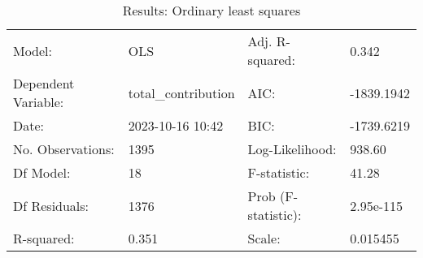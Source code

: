 \begin{table}
\caption{Results: Ordinary least squares}
\label{}
\begin{center}
\begin{tabular}{llll}
\hline
Model:              & OLS                 & Adj. R-squared:     & 0.342       \\
Dependent Variable: & total\_contribution & AIC:                & -1839.1942  \\
Date:               & 2023-10-16 10:42    & BIC:                & -1739.6219  \\
No. Observations:   & 1395                & Log-Likelihood:     & 938.60      \\
Df Model:           & 18                  & F-statistic:        & 41.28       \\
Df Residuals:       & 1376                & Prob (F-statistic): & 2.95e-115   \\
R-squared:          & 0.351               & Scale:              & 0.015455    \\
\hline
\end{tabular}
\end{center}


\end{table}
